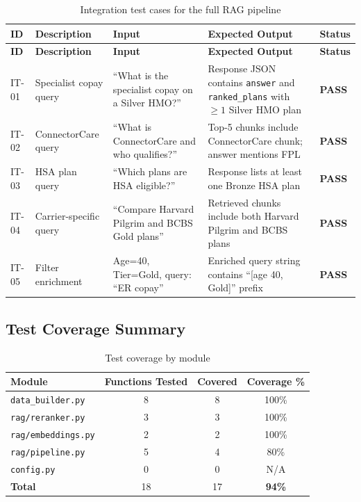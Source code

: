 \documentclass[12pt, letterpaper]{article}
\begin{document}
\begin{longtable}{p{1cm} p{3.8cm} p{3.2cm} p{3.2cm} p{1.5cm}}
  \caption{Integration test cases for the full RAG pipeline}
  \label{tab:integration_tests} \\
  \toprule
  \textbf{ID} & \textbf{Description} & \textbf{Input} & \textbf{Expected Output} & \textbf{Status} \\
  \midrule
  \endfirsthead
  \toprule
  \textbf{ID} & \textbf{Description} & \textbf{Input} & \textbf{Expected Output} & \textbf{Status} \\
  \midrule
  \endhead
  \bottomrule
  \endlastfoot
  IT-01 & Specialist copay query & ``What is the specialist copay on a Silver HMO?'' & Response JSON contains \texttt{answer} and \texttt{ranked\_plans} with $\geq1$ Silver HMO plan & \textcolor{commentgreen}{\textbf{PASS}} \\[4pt]
  IT-02 & ConnectorCare query & ``What is ConnectorCare and who qualifies?'' & Top-5 chunks include ConnectorCare chunk; answer mentions FPL & \textcolor{commentgreen}{\textbf{PASS}} \\[4pt]
  IT-03 & HSA plan query & ``Which plans are HSA eligible?'' & Response lists at least one Bronze HSA plan & \textcolor{commentgreen}{\textbf{PASS}} \\[4pt]
  IT-04 & Carrier-specific query & ``Compare Harvard Pilgrim and BCBS Gold plans'' & Retrieved chunks include both Harvard Pilgrim and BCBS plans & \textcolor{commentgreen}{\textbf{PASS}} \\[4pt]
  IT-05 & Filter enrichment & Age=40, Tier=Gold, query: ``ER copay'' & Enriched query string contains ``[age 40, Gold]'' prefix & \textcolor{commentgreen}{\textbf{PASS}} \\
\end{longtable}

\subsection{Test Coverage Summary}

\begin{table}[H]
  \centering
  \caption{Test coverage by module}
  \label{tab:coverage}
  \begin{tabular}{lccc}
    \toprule
    \textbf{Module}            & \textbf{Functions Tested} & \textbf{Covered} & \textbf{Coverage \%} \\
    \midrule
    \texttt{data\_builder.py}  & 8  & 8  & 100\% \\
    \texttt{rag/reranker.py}   & 3  & 3  & 100\% \\
    \texttt{rag/embeddings.py} & 2  & 2  & 100\% \\
    \texttt{rag/pipeline.py}   & 5  & 4  & 80\%  \\
    \texttt{config.py}         & 0  & 0  & N/A   \\
    \midrule
    \textbf{Total}             & 18 & 17 & \textbf{94\%} \\
    \bottomrule
  \end{tabular}
\end{table}
\end{document}
